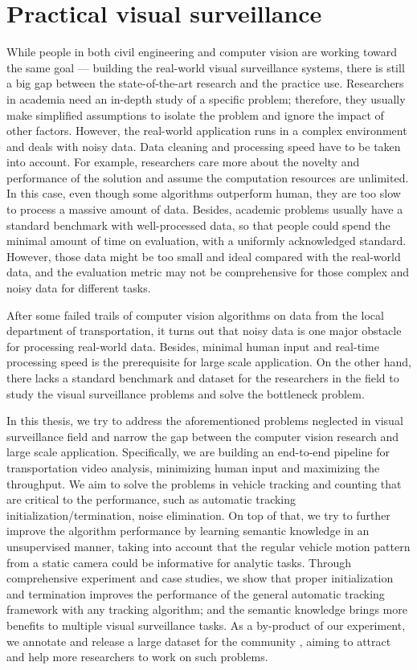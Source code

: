\section{Practical visual surveillance}
\label{sec:intro-surveillance-cv}

While people in both civil engineering and computer vision are working toward the same goal --- building the real-world visual surveillance systems, there is still a big gap between the state-of-the-art research and the practice use.
Researchers in academia need an in-depth study of a specific problem; therefore, they usually make simplified assumptions to isolate the problem and ignore the impact of other factors. 
However, the real-world application runs in a complex environment and deals with noisy data. Data cleaning and processing speed have to be taken into account.
For example, researchers care more about the novelty and performance of the solution and assume the computation resources are unlimited. 
In this case, even though some algorithms outperform human, they are too slow to process a massive amount of data. 
Besides, academic problems usually have a standard benchmark with well-processed data, so that people could spend the minimal amount of time on evaluation, with a uniformly acknowledged standard.
However, those data might be too small and ideal compared with the real-world data, and the evaluation metric may not be comprehensive for those complex and noisy data for different tasks.

After some failed trails of computer vision algorithms on data from the local department of transportation, it turns out that noisy data is one major obstacle for processing real-world data. 
Besides, minimal human input and real-time processing speed is the prerequisite for large scale application.
On the other hand, there lacks a standard benchmark and dataset for the researchers in the field to study the visual surveillance problems and solve the bottleneck problem.

In this thesis, we try to address the aforementioned problems neglected in visual surveillance field and narrow the gap between the computer vision research and large scale application. 
Specifically, we are building an end-to-end pipeline for transportation video analysis, minimizing human input and maximizing the throughput.
We aim to solve the problems in vehicle tracking and counting that are critical to the performance, such as automatic tracking initialization/termination, noise elimination.
On top of that, we try to further improve the algorithm performance by learning semantic knowledge in an unsupervised manner, taking into account that the regular vehicle motion pattern from a static camera could be informative for analytic tasks.
Through comprehensive experiment and case studies, we show that proper initialization and termination improves the performance of the general automatic tracking framework with any tracking algorithm; and the semantic knowledge brings more benefits to multiple visual surveillance tasks.
As a by-product of our experiment, we annotate and release a large dataset for the community \cite{yanziVehicleTracker}, aiming to attract and help more researchers to work on such problems.